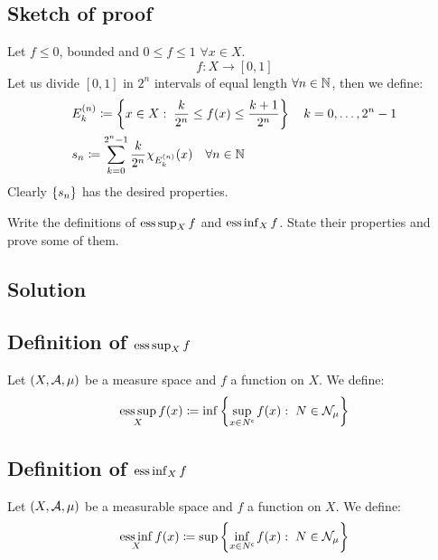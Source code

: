 \subsection*{Sketch of proof}
Let $f\leq0$, bounded and $0 \leq f \leq 1$ $\forall x\in X$.
\[
    f : X \to [0,1]
\]
Let us divide $[0,1]$ in $2^n$ intervals of equal length $\forall n \in \mathbb{N}$, then we define:
\begin{align*}
     & E_k^{(n)} \coloneqq \left\{ x\in X: \; \frac{k}{2^n} \leq f(x) \leq \frac{k+1}{2^n} \right\} \quad k = 0,\dots,2^n-1 \\
     & s_n \coloneqq \sum_{k=0}^{2^n-1} \frac{k}{2^n} \chi_{E_k^{(n)}}(x) \quad \forall n\in\mathbb{N}
\end{align*}
Clearly $\{ s_n \}$ has the desired properties.


\question

Write the definitions of $\operatorname*{ess\,sup}_X f$ and $\operatorname*{ess\,inf}_X f$. State their properties and prove some of them.

\subsection*{Solution}

\subsection{Definition of \texorpdfstring{$\operatorname*{ess\,sup}_X f$}{essup f}}
Let $(X, \mathcal{A}, \mu)$ be a measure space and $f$ a function on $X$. We define:
\[
    \operatorname*{ess\,sup}_X f(x) \coloneqq \inf \left\{ \sup_{x\in N^{\mathsf{c}}} f(x) : \; N \in \mathcal{N}_{\mu} \right\}
\]

\subsection{Definition of \texorpdfstring{$\operatorname*{ess\,inf}_X f$}{essinf f}}
Let $(X, \mathcal{A}, \mu)$ be a measurable space and $f$ a function on $X$. We define:
\[
    \operatorname*{ess\,inf}_X f(x) \coloneqq \sup \left\{ \inf_{x\in N^{\mathsf{c}}} f(x) : \; N \in \mathcal{N}_{\mu} \right\}
\]

